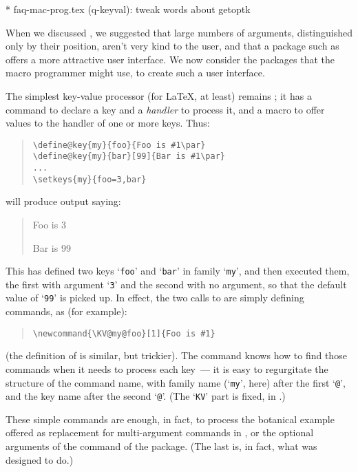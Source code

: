         * faq-mac-prog.tex (q-keyval): tweak words about getoptk


When we discussed %
, we
suggested that large numbers of arguments, distinguished only by their
position, aren't very kind to the user, and that a package such as
 offers a more attractive user interface.  We now
consider the packages that the macro programmer might use, to create
such a user interface.

The simplest key-value processor (for \LaTeX{}, at least) remains
; it has a command  to declare a key
and a \emph{handler} to process it, and a macro  to offer
values to the handler of one or more keys.  Thus:
\begin{quote}
\begin{verbatim}
\define@key{my}{foo}{Foo is #1\par}
\define@key{my}{bar}[99]{Bar is #1\par}
...
\setkeys{my}{foo=3,bar}
\end{verbatim}
\end{quote}
will produce output saying:
\begin{quote}
  Foo is 3\par{}
  Bar is 99
\end{quote}
This has defined two keys `\texttt{foo}' and `\texttt{bar}' in family
`\texttt{my}', and then executed them, the first with argument
`\texttt{3}' and the second with no argument, so that the default
value of `\texttt{99}' is picked up.  In effect, the two calls to
 are simply defining commands, as (for example):
\begin{quote}
\begin{verbatim}
\newcommand{\KV@my@foo}[1]{Foo is #1}
\end{verbatim}
\end{quote}
(the definition of  is similar, but trickier).  The
command  knows how to find those commands when it needs to
process each key~--- it is easy to regurgitate the structure of the
command name, with family name (`\texttt{my}', here) after the first
`\texttt{@}', and the key name after the second `\texttt{@}'.  (The
`\texttt{KV}' part is fixed, in .)

These simple commands are enough, in fact, to process the botanical
example offered as replacement for multi-argument commands in %
, or the
optional arguments of the  command of the
 package.  (The last is, in fact, what
 was designed to do.)

